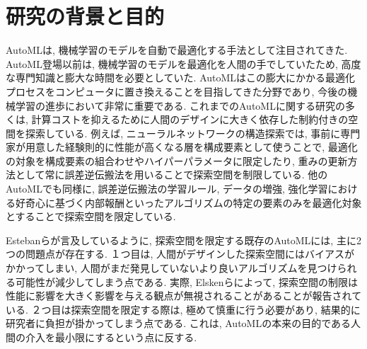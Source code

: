 \documentclass[11pt,oneside,openany,report]{jsbook}
\begin{document}
\section{研究の背景と目的}\label{sec:intr:background}

AutoMLは, 機械学習のモデルを自動で最適化する手法として注目されてきた. AutoML登場以前は, 機械学習のモデルを最適化を人間の手でしていたため, 高度な専門知識と膨大な時間を必要としていた. AutoMLはこの膨大にかかる最適化プロセスをコンピュータに置き換えることを目指してきた分野であり\cite{Fahlman_1989}\cite{Hutter_2011}\cite{Finn_2017}, 今後の機械学習の進歩において非常に重要である. これまでのAutoMLに関する研究の多くは, 計算コストを抑えるために人間のデザインに大きく依存した制約付きの空間を探索している. 例えば, ニューラルネットワークの構造探索では, 事前に専門家が用意した経験則的に性能が高くなる層を構成要素として使うことで, 最適化の対象を構成要素の組合わせやハイパーパラメータに限定したり, 重みの更新方法として常に誤差逆伝搬法を用いることで探索空間を制限している\cite{Zoph_2016}\cite{Real_2019}\cite{Tan_2019}. 他のAutoMLでも同様に, 誤差逆伝搬法の学習ルール, データの増強, 強化学習における好奇心に基づく内部報酬といったアルゴリズムの特定の要素のみを最適化対象とすることで探索空間を限定している\cite{Andrychowicz_2016}\cite{Cubuk_2019}\cite{Alet_2020}.

Estebanらが言及しているように, 探索空間を限定する既存のAutoMLには, 主に2つの問題点が存在する\cite{automl_zero}. １つ目は, 人間がデザインした探索空間にはバイアスがかかってしまい, 人間がまだ発見していないより良いアルゴリズムを見つけられる可能性が減少してしまう点である. 実際, Elskenらによって, 探索空間の制限は性能に影響を大きく影響を与える観点が無視されることがあることが報告されている\cite{Yang_2019}. ２つ目は探索空間を限定する際は, 極めて慎重に行う必要があり\cite{Zoph_2018}\cite{So_2019}\cite{Negrinho_2019}, 結果的に研究者に負担が掛かってしまう点である. これは, AutoMLの本来の目的である人間の介入を最小限にするという点に反する.
\end{document}
